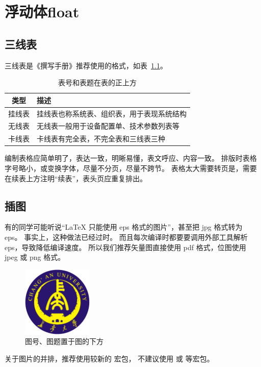 
\chapter{浮动体float}

\section{三线表}

三线表是《撰写手册》推荐使用的格式，如表~\ref{tab:exampletable}。
\begin{table}[htb]
  \centering
  \caption{表号和表题在表的正上方}
  \label{tab:exampletable}
  \begin{tabular}{cl}
    \toprule
    类型   & 描述                                       \\
    \midrule
    挂线表 & 挂线表也称系统表、组织表，用于表现系统结构 \\
    无线表 & 无线表一般用于设备配置单、技术参数列表等   \\
    卡线表 & 卡线表有完全表，不完全表和三线表三种       \\
    \bottomrule
  \end{tabular}
\end{table}

编制表格应简单明了，表达一致，明晰易懂，表文呼应、内容一致。
排版时表格字号略小，或变换字体，尽量不分页，尽量不跨节。
表格太大需要转页是，需要在续表上方注明“续表”，表头页应重复排出。



\section{插图}

有的同学可能听说“\LaTeX{} 只能使用 eps 格式的图片”，甚至把 jpg 格式转为 eps。
事实上，这种做法已经过时。
而且每次编译时都要要调用外部工具解析 eps，导致降低编译速度。
所以我们推荐矢量图直接使用 pdf 格式，位图使用 jpeg 或 png 格式。
\begin{figure}[htb]
  \centering
  \includegraphics[width=0.3\textwidth]{figures/chdcolorlogo.eps}
  \caption{图号、图题置于图的下方}
  \label{fig:logo}
\end{figure}

关于图片的并排，推荐使用较新的  宏包，
不建议使用  或  等宏包。
